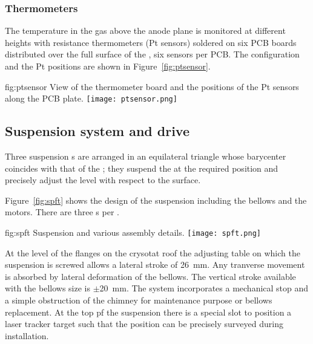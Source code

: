 \subsubsection{Thermometers}

The temperature in the gas above the anode plane is monitored at different heights with resistance thermometers (Pt sensors) soldered on  six PCB boards distributed over the full surface of the , six 
sensors per PCB. The configuration and the Pt positions are shown in Figure~\ref{fig:ptsensor}.

\begin{dunefigure}{fig:ptsensor}
{View of the thermometer board and the positions of the Pt sensors along the PCB plate.}
\texttt{[image: ptsensor.png]}
\end{dunefigure}

\subsection{Suspension system and drive}
\label{sec:fddp-crp-suspension}
Three suspension \fdth{}s are arranged in an equilateral triangle whose barycenter coincides with that of the ; they suspend the  at the required position and precisely adjust the  level with respect to the \lar surface.

Figure~\ref{fig:spft} shows the design of the suspension \fdth including the bellows and the motors. There are three \fdth{}s per .

\begin{dunefigure}{fig:spft}
{Suspension \fdth and various assembly details.}
\texttt{[image: spft.png]}
\end{dunefigure}

At the level of the flanges on the crysotat roof the adjusting table on which the suspension \fdth is screwed allows a lateral stroke of \SI{26}{mm}. Any tranverse movement is absorbed by lateral deformation of the bellows.
The vertical stroke available with the bellows size is $\pm$\SI{20}{mm}.
The system incorporates a  mechanical stop and a simple obstruction of the chimney for maintenance purpose or bellows replacement.
At the top pf the suspension \fdth there is a special slot to position a laser tracker target
such that the \fdth position can be precisely surveyed during installation.


